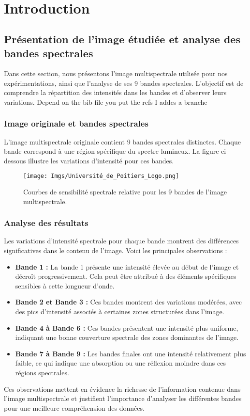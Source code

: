 \chapter{Introduction}
\section{Présentation de l'image étudiée et analyse des bandes spectrales}

Dans cette section, nous présentons l'image multispectrale utilisée pour nos expérimentations, ainsi que l'analyse de ses 9 bandes spectrales. L'objectif est de comprendre la répartition des intensités dans les bandes et d'observer leurs variations. Depend on the bib file you put the refs \cite{islam2012artificial}
I addes a branche

\subsection{Image originale et bandes spectrales}

L'image multispectrale originale contient 9 bandes spectrales distinctes. Chaque bande correspond à une région spécifique du spectre lumineux. La figure ci-dessous illustre les variations d'intensité pour ces bandes.

\begin{figure}[H]
    \centering
    \texttt{[image: Imgs/Université\_de\_Poitiers\_Logo.png]}
    \caption{Courbes de sensibilité spectrale relative pour les 9 bandes de l'image multispectrale.}
    \label{fig:multispectral_bands}
\end{figure}

\subsection{Analyse des résultats}

Les variations d'intensité spectrale pour chaque bande montrent des différences significatives dans le contenu de l'image. Voici les principales observations :
\begin{itemize}
    \item \textbf{Bande 1 :} La bande 1 présente une intensité élevée au début de l'image et décroît progressivement. Cela peut être attribué à des éléments spécifiques sensibles à cette longueur d'onde.
    \item \textbf{Bande 2 et Bande 3 :} Ces bandes montrent des variations modérées, avec des pics d'intensité associés à certaines zones structurées dans l'image.
    \item \textbf{Bande 4 à Bande 6 :} Ces bandes présentent une intensité plus uniforme, indiquant une bonne couverture spectrale des zones dominantes de l'image.
    \item \textbf{Bande 7 à Bande 9 :} Les bandes finales ont une intensité relativement plus faible, ce qui indique une absorption ou une réflexion moindre dans ces régions spectrales.
\end{itemize}

Ces observations mettent en évidence la richesse de l'information contenue dans l'image multispectrale et justifient l'importance d'analyser les différentes bandes pour une meilleure compréhension des données.
